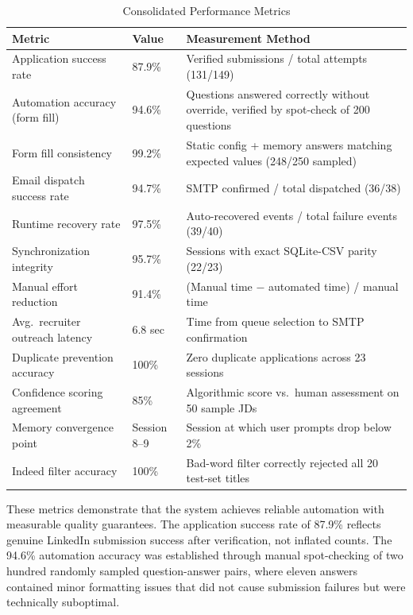 \documentclass[12pt, a4paper, oneside]{report}
\begin{document}
\begin{table}[H]
\centering
\caption{Consolidated Performance Metrics}
\label{tab:perf-metrics}
\small
\begin{tabularx}{\textwidth}{|l|l|X|}
\hline
\textbf{Metric} & \textbf{Value} & \textbf{Measurement Method} \\
\hline
Application success rate & 87.9\% & Verified submissions / total attempts (131/149) \\
\hline
Automation accuracy (form fill) & 94.6\% & Questions answered correctly without override, verified by spot-check of 200 questions \\
\hline
Form fill consistency & 99.2\% & Static config + memory answers matching expected values (248/250 sampled) \\
\hline
Email dispatch success rate & 94.7\% & SMTP confirmed / total dispatched (36/38) \\
\hline
Runtime recovery rate & 97.5\% & Auto-recovered events / total failure events (39/40) \\
\hline
Synchronization integrity & 95.7\% & Sessions with exact SQLite-CSV parity (22/23) \\
\hline
Manual effort reduction & 91.4\% & (Manual time $-$ automated time) / manual time \\
\hline
Avg.\ recruiter outreach latency & 6.8 sec & Time from queue selection to SMTP confirmation \\
\hline
Duplicate prevention accuracy & 100\% & Zero duplicate applications across 23 sessions \\
\hline
Confidence scoring agreement & 85\% & Algorithmic score vs.\ human assessment on 50 sample JDs \\
\hline
Memory convergence point & Session 8--9 & Session at which user prompts drop below 2\% \\
\hline
Indeed filter accuracy & 100\% & Bad-word filter correctly rejected all 20 test-set titles \\
\hline
\end{tabularx}
\end{table}

These metrics demonstrate that the system achieves reliable automation with measurable quality guarantees. The application success rate of 87.9\% reflects genuine LinkedIn submission success after verification, not inflated counts. The 94.6\% automation accuracy was established through manual spot-checking of two hundred randomly sampled question-answer pairs, where eleven answers contained minor formatting issues that did not cause submission failures but were technically suboptimal.
\end{document}
